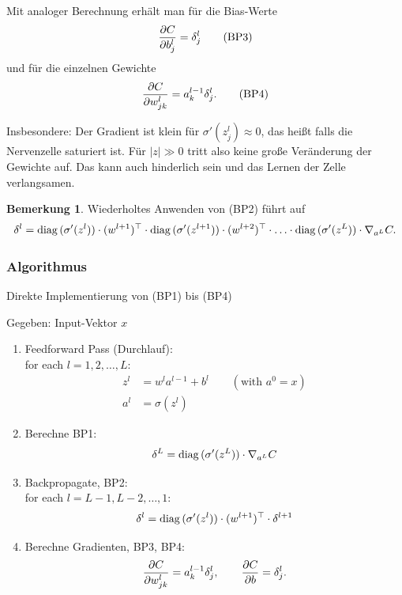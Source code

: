 \documentclass[
 a4paper,
 12pt,
 parskip=half
 ]{scrreprt}
\theoremstyle{plain}
\theoremstyle{definition}
\newtheorem*{rmrk*}{Bemerkung}
\begin{document}
Mit analoger Berechnung erhält man für die Bias-Werte
\[ \frac{\partial C}{\partial b_j^l} = \delta_j^l \tag{BP3} \]
und für die einzelnen Gewichte
\[ \frac{\partial C}{\partial w_{jk}^l} = a_k^{l-1} \delta_j^l. \tag{BP4} \]

Insbesondere: Der Gradient ist klein für $\sigma'(z_j^l) \approx 0$, das heißt
falls die Nervenzelle saturiert ist. Für $|z| \gg 0$ tritt also keine große
Veränderung der Gewichte auf. Das kann auch hinderlich sein und das Lernen der
Zelle verlangsamen.

\begin{rmrk*}
  Wiederholtes Anwenden von (BP2) führt auf
  \[ \delta^l = \mathrm{diag}\,( \sigma'(z^l)) \cdot (w^{l+1})^\top \cdot
    \mathrm{diag}\,(\sigma'(z^{l+1})) \cdot (w^{l+2})^\top \cdot \ldots \cdot \mathrm{diag}\,(\sigma'(z^L))
    \cdot \nabla_{a^L} C. \]
\end{rmrk*}

\subsubsection*{Algorithmus}
Direkte Implementierung von (BP1) bis (BP4)

Gegeben: Input-Vektor $x$
\begin{enumerate}
\item Feedforward Pass (Durchlauf): \\
  for each $l = 1, 2, \ldots, L$:
  \begin{align*}
    z^l &= w^l a^{l-1} + b^l \qquad (\text{with } a^0 = x) \\
    a^l &= \sigma(z^l)
  \end{align*}
\item Berechne BP1:
  \[ \delta^L = \mathrm{diag}\,(\sigma'(z^L)) \cdot \nabla_{a^L} C \]
\item Backpropagate, BP2: \\
  for each $l = L-1, L-2, \ldots, 1$:
  \[ \delta^l = \mathrm{diag}\,( \sigma'(z^l)) \cdot (w^{l+1})^\top \cdot \delta^{l+1} \]
\item Berechne Gradienten, BP3, BP4:
  \[ \frac{\partial C}{\partial w_{jk}^l} = a_k^{l-1} \delta_j^l, \qquad
    \frac{\partial C}{\partial b} = \delta_j^l. \]
\end{enumerate}
\end{document}
